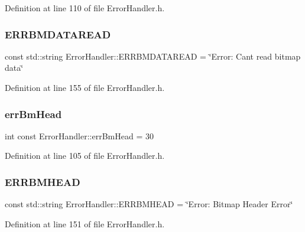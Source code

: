 Definition at line 110 of file Error\+Handler.\+h.

\mbox{\label{classErrorHandler_a0cc80205269faf8ab6a2898627d1d078}} 
\subsubsection{\texorpdfstring{ERRBMDATAREAD}{ERRBMDATAREAD}}
{\footnotesize\ttfamily const std\+::string Error\+Handler\+::\+E\+R\+R\+B\+M\+D\+A\+T\+A\+R\+E\+AD = \char`\"{}Error\+: Can\textquotesingle{}t read bitmap data\char`\"{}\hspace{0.3cm}{\ttfamily [static]}}



Definition at line 155 of file Error\+Handler.\+h.

\mbox{\label{classErrorHandler_a9387c79594c780b28b71ec7a6adc5f8c}} 
\subsubsection{\texorpdfstring{errBmHead}{errBmHead}}
{\footnotesize\ttfamily int const Error\+Handler\+::err\+Bm\+Head = 30\hspace{0.3cm}{\ttfamily [static]}}



Definition at line 105 of file Error\+Handler.\+h.

\mbox{\label{classErrorHandler_ace09849c636b0d6692e5437dfd3fb099}} 
\subsubsection{\texorpdfstring{ERRBMHEAD}{ERRBMHEAD}}
{\footnotesize\ttfamily const std\+::string Error\+Handler\+::\+E\+R\+R\+B\+M\+H\+E\+AD = \char`\"{}Error\+: Bitmap Header Error\char`\"{}\hspace{0.3cm}{\ttfamily [static]}}



Definition at line 151 of file Error\+Handler.\+h.

